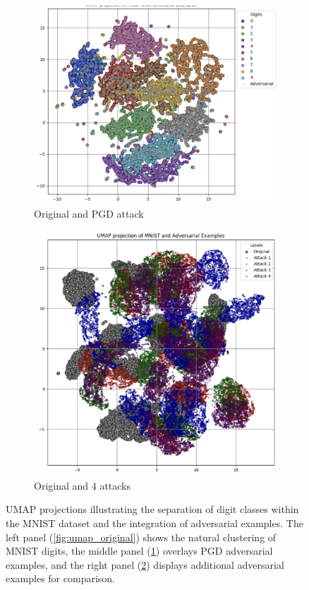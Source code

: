 \documentclass[10pt, conference, a4paper, final]{IEEEtran}
\begin{document}
\begin{figure}[!ht]
\begin{subfigure}{.34\textwidth}
        \includegraphics[width=\linewidth]{paper_images/UMAP_adv.png}
        \caption{Original and PGD attack}
        \label{fig:umap_pgd}
    \end{subfigure}%
    \hfill
    \begin{subfigure}{.28\textwidth}
        \centering
        \includegraphics[width=\linewidth]{paper_images/UMAP_adversary.png}
        \caption{Original and 4 attacks}
        \label{fig:umap_additional_adv}
    \end{subfigure}
    \caption{UMAP projections illustrating the separation of digit classes within the MNIST dataset and the integration of adversarial examples. The left panel (\ref{fig:umap_original}) shows the natural clustering of MNIST digits, the middle panel (\ref{fig:umap_pgd}) overlays PGD adversarial examples, and the right panel (\ref{fig:umap_additional_adv}) displays additional adversarial examples for comparison.}
    \label{fig:umap}
\end{figure}
\end{document}
